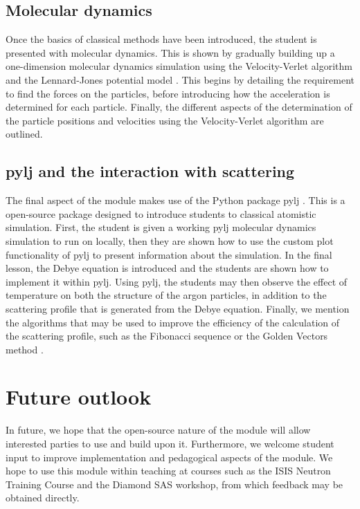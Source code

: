 \documentclass[pdf]{iucr}              %
\begin{document}
\subsection{Molecular dynamics}

Once the basics of classical methods have been introduced, the student is presented with molecular dynamics.
This is shown by gradually building up a one-dimension molecular dynamics simulation using the Velocity-Verlet algorithm \cite{Swope1982} and the Lennard-Jones potential model \cite{LennardJones1924}.
This begins by detailing the requirement to find the forces on the particles, before introducing how the acceleration is determined for each particle.
Finally, the different aspects of the determination of the particle positions and velocities using the Velocity-Verlet algorithm are outlined.

\subsection{pylj and the interaction with scattering}

The final aspect of the module makes use of the Python package pylj \cite{McCluskey2018}.
This is a open-source package designed to introduce students to classical atomistic simulation.
First, the student is given a working pylj molecular dynamics simulation to run on locally, then they are shown how to use the custom plot functionality of pylj to present information about the simulation.
In the final lesson, the Debye equation is introduced and the students are shown how to implement it within pylj.
Using pylj, the students may then observe the effect of temperature on both the structure of the argon particles, in addition to the scattering profile that is generated from the Debye equation.
Finally, we mention the algorithms that may be used to improve the efficiency of the calculation of the scattering profile, such as the Fibonacci sequence or the Golden Vectors method \cite{Svergun1994, Watson2013}.

\section{Future outlook}

In future, we hope that the open-source nature of the module will allow interested parties to use and build upon it.
Furthermore, we welcome student input to improve implementation and pedagogical aspects of the module.
We hope to use this module within teaching at courses such as the ISIS Neutron Training Course and the Diamond SAS workshop, from which feedback may be obtained directly.
\end{document}
